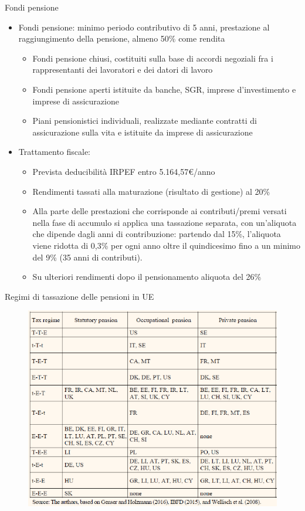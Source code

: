 \documentclass[aspectratio=149,11pt,italian]{beamer}
\begin{document}
\begin{frame}{Fondi pensione}
\begin{itemize}
\item Fondi pensione: minimo periodo contributivo di 5 anni, prestazione al
raggiungimento della pensione, almeno 50\% come rendita
\begin{itemize}
\item \alert{Fondi pensione chiusi}, costituiti sulla base di accordi negoziali fra i rappresentanti dei lavoratori e dei datori di lavoro
\item \alert{Fondi pensione aperti} istituite da banche, SGR, imprese d’investimento e imprese di assicurazione
\item \alert{Piani pensionistici individuali}, realizzate mediante contratti di assicurazione sulla vita e istituite da imprese di assicurazione
\end{itemize}
\item Trattamento fiscale:
\begin{itemize}
\item Prevista deducibilità IRPEF entro 5.164,57€/anno
\item Rendimenti tassati alla maturazione (risultato di gestione) al 20\%
\item Alla parte delle prestazioni che corrisponde ai contributi/premi versati
nella fase di accumulo si applica una tassazione separata, con un’aliquota
che dipende dagli anni di contribuzione: partendo dal 15\%, l’aliquota
viene ridotta di 0,3\% per ogni anno oltre il quindicesimo fino a un minimo
del 9\% (35 anni di contributi).
\item Su ulteriori rendimenti dopo il pensionamento aliquota del 26\%
\end{itemize}
\end{itemize}
\end{frame}

\begin{frame}{Regimi di tassazione delle pensioni in UE}
\begin{figure}
\includegraphics[width=.75\textwidth]{./figure/regimi-tassazione-pensioni.png}
\end{figure}
\end{frame}
\end{document}
